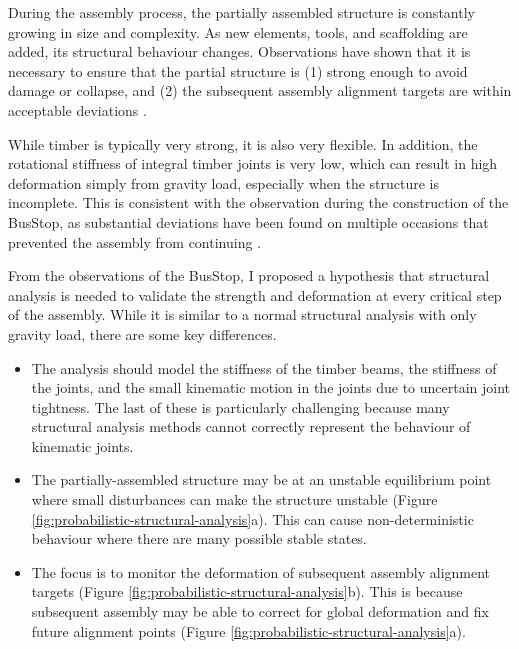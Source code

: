During the assembly process, the partially assembled structure is constantly growing in size and complexity. As new elements, tools, and scaffolding are added, its structural behaviour changes. Observations have shown that it is necessary to ensure that the partial structure is (1) strong enough to avoid damage or collapse, and (2) the subsequent assembly alignment targets are within acceptable deviations . 

While timber is typically very strong, it is also very flexible. In addition, the rotational stiffness of integral timber joints is very low, which can result in high deformation simply from gravity load, especially when the structure is incomplete. This is consistent with the observation during the construction of the BusStop, as substantial deviations have been found on multiple occasions that prevented the assembly from continuing . 

From the observations of the BusStop, I proposed a hypothesis that structural analysis is needed to validate the strength and deformation at every critical step of the assembly. While it is similar to a normal structural analysis with only gravity load, there are some key differences. 

\begin{itemize}
	\item The analysis should model the stiffness of the timber beams, the stiffness of the joints, and the small kinematic motion in the joints due to uncertain joint tightness. The last of these is particularly challenging because many structural analysis methods cannot correctly represent the behaviour of kinematic joints. 

	\item The partially-assembled structure may be at an unstable equilibrium point where small disturbances can make the structure unstable (Figure \ref{fig:probabilistic-structural-analysis}a). This can cause non-deterministic behaviour where there are many possible stable states.

	\item The focus is to monitor the deformation of subsequent assembly alignment targets (Figure \ref{fig:probabilistic-structural-analysis}b). This is because subsequent assembly may be able to correct for global deformation and fix future alignment points (Figure \ref{fig:probabilistic-structural-analysis}a).
\end{itemize}

